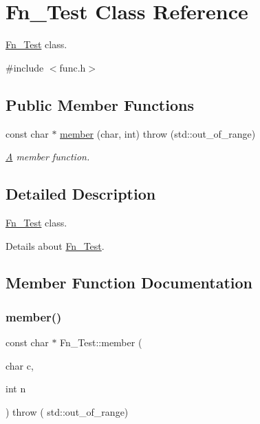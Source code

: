 \hypertarget{class_fn___test}{}\section{Fn\+\_\+\+Test Class Reference}
\label{class_fn___test}


\mbox{\hyperlink{class_fn___test}{Fn\+\_\+\+Test}} class.  




{\ttfamily \#include $<$func.\+h$>$}

\subsection*{Public Member Functions}
\begin{DoxyCompactItemize}
\item 
const char $\ast$ \mbox{\hyperlink{class_fn___test_a823b5c9726bb8f6ece50e57ac8e3092c}{member}} (char, int)  throw (std\+::out\+\_\+of\+\_\+range)
\begin{DoxyCompactList}\small\item\em \mbox{\hyperlink{class_a}{A}} member function. \end{DoxyCompactList}\end{DoxyCompactItemize}


\subsection{Detailed Description}
\mbox{\hyperlink{class_fn___test}{Fn\+\_\+\+Test}} class. 

Details about \mbox{\hyperlink{class_fn___test}{Fn\+\_\+\+Test}}. 

\subsection{Member Function Documentation}
\mbox{\label{class_fn___test_a823b5c9726bb8f6ece50e57ac8e3092c}} 
\subsubsection{\texorpdfstring{member()}{member()}}
{\footnotesize\ttfamily const char $\ast$ Fn\+\_\+\+Test\+::member (\begin{DoxyParamCaption}\item[{char}]{c,  }\item[{int}]{n }\end{DoxyParamCaption}) throw ( std\+::out\+\_\+of\+\_\+range) }



